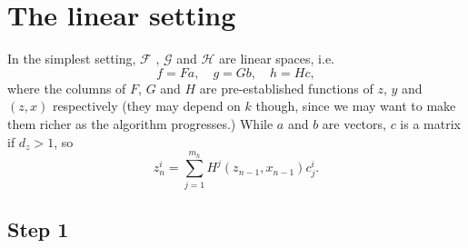 \documentclass[a4paper,11pt]{article}
\theoremstyle{definition}
\begin{document}
\section{The linear setting}


In the simplest setting, $\mathcal F$ , $\mathcal G$ and $\mathcal H$ are linear spaces, i.e.
%
$$ f = F a, \quad g = G b,  \quad h = H c,$$
%
where the columns of $F$, $G$ and $H$ are pre-established functions of $z$, $y$ and $(z, x)$ respectively (they may depend on $k$ though, since we may want to make them richer as the algorithm progresses.) While $a$ and $b$ are vectors, $c$ is a matrix if $d_z > 1$, so
%
$$ z_{n}^i = \sum_{j=1}^{m_h} H^j\left(z_{n-1}, x_{n-1}\right) c_j^i. $$


\subsection{Step 1}
\end{document}
